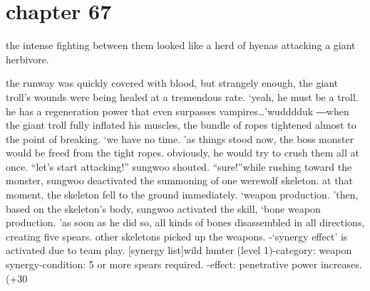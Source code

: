\section{chapter 67}

                            the intense fighting between them looked like a herd of hyenas attacking a giant herbivore.





the runway was quickly covered with blood, but strangely enough, the giant troll’s wounds were being healed at a tremendous rate.
‘yeah, he must be a troll.
 he has a regeneration power that even surpasses vampires…’wudddduk ―when the giant troll fully inflated his muscles, the bundle of ropes tightened almost to the point of breaking.
‘we have no time.
’as things stood now, the boss monster would be freed from the tight ropes.
 obviously, he would try to crush them all at once.
“let’s start attacking!” sungwoo shouted.
“sure!”while rushing toward the monster, sungwoo deactivated the summoning of one werewolf skeleton.
 at that moment, the skeleton fell to the ground immediately.
‘weapon production.
’then, based on the skeleton’s body, sungwoo activated the skill, ‘bone weapon production.
’as soon as he did so, all kinds of bones disassembled in all directions, creating five spears.
other skeletons picked up the weapons.
-‘synergy effect’ is activated due to team play.
[synergy list]wild hunter (level 1)-category: weapon synergy-condition: 5 or more spears required.
-effect: penetrative power increases.
 (+30%

